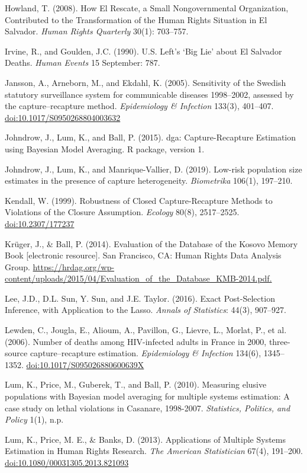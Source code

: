 \documentclass[11pt,]{article}
\begin{document}
Howland, T. (2008). How El Rescate, a Small Nongovernmental
Organization, Contributed to the Transformation of the Human Rights
Situation in El Salvador. \emph{Human Rights Quarterly} 30(1): 703--757.

Irvine, R., and Goulden, J.C. (1990). U.S. Left's `Big Lie' about El
Salvador Deaths. \emph{Human Events} 15 September: 787.

Jansson, A., Arneborn, M., and Ekdahl, K. (2005). Sensitivity of the
Swedish statutory surveillance system for communicable diseases
1998--2002, assessed by the capture--recapture method.
\emph{Epidemiology \& Infection} 133(3), 401--407.
\url{doi:10.1017/S0950268804003632}

Johndrow, J., Lum, K., and Ball, P. (2015). dga: Capture-Recapture
Estimation using Bayesian Model Averaging. R package, version 1.

Johndrow, J., Lum, K., and Manrique-Vallier, D. (2019). Low-risk
population size estimates in the presence of capture heterogeneity.
\emph{Biometrika} 106(1), 197--210.

Kendall, W. (1999). Robustness of Closed Capture-Recapture Methods to
Violations of the Closure Assumption. \emph{Ecology} 80(8), 2517--2525.
\url{doi:10.2307/177237}

Krüger, J., \& Ball, P. (2014). Evaluation of the Database of the Kosovo
Memory Book {[}electronic resource{]}. San Francisco, CA: Human Rights
Data Analysis Group.
\url{https://hrdag.org/wp-content/uploads/2015/04/Evaluation_of_the_Database_KMB-2014.pdf.}

Lee, J.D., D.L. Sun, Y. Sun, and J.E. Taylor. (2016). Exact
Post-Selection Inference, with Application to the Lasso. \emph{Annals of
Statistics}: 44(3), 907--927.

Lewden, C., Jougla, E., Alioum, A., Pavillon, G., Lievre, L., Morlat,
P., et al. (2006). Number of deaths among HIV-infected adults in France
in 2000, three-source capture--recapture estimation. \emph{Epidemiology
\& Infection} 134(6), 1345--1352. \url{doi:10.1017/S095026880600639X}

Lum, K., Price, M., Guberek, T., and Ball, P. (2010). Measuring elusive
populations with Bayesian model averaging for multiple systems
estimation: A case study on lethal violations in Casanare, 1998-2007.
\emph{Statistics, Politics, and Policy} 1(1), n.p.

Lum, K., Price, M. E., \& Banks, D. (2013). Applications of Multiple
Systems Estimation in Human Rights Research. \emph{The American
Statistician} 67(4), 191--200. \url{doi:10.1080/00031305.2013.821093}
\end{document}
